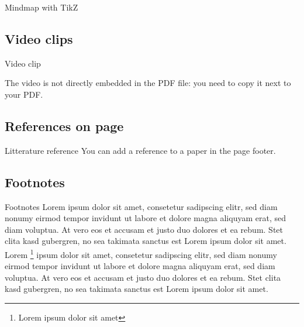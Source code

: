 \documentclass[compress]{beamer}
\begin{document}
\begin{frame}{Mindmap with TikZ}
\centering
{}
\end{frame}

\subsection{Video clips}

\begin{frame}{Video clip}
    \centering

    The video is not directly embedded in the PDF file: you need to copy it next
    to your PDF.

\end{frame}



\subsection{References on page}

{

    \begin{frame}{Litterature reference}
        You can add a reference to a paper in the page footer.
    \end{frame}
}



\subsection{Footnotes}
\begin{frame}{Footnotes}
Lorem ipsum dolor sit amet, consetetur sadipscing elitr, sed diam nonumy
eirmod tempor invidunt ut labore et dolore magna aliquyam erat, sed diam
voluptua. At vero eos et accusam et justo duo dolores et ea rebum. Stet
clita kasd gubergren, no sea takimata sanctus est Lorem ipsum dolor sit
amet. Lorem \footnote{Lorem ipsum dolor sit amet} ipsum dolor sit amet,
consetetur sadipscing elitr, sed diam nonumy eirmod tempor invidunt ut
labore et dolore magna aliquyam erat, sed diam voluptua. At vero eos et
accusam et justo duo dolores et ea rebum. Stet clita kasd gubergren, no sea
takimata sanctus est Lorem ipsum dolor sit amet.

\end{frame}
\end{document}
